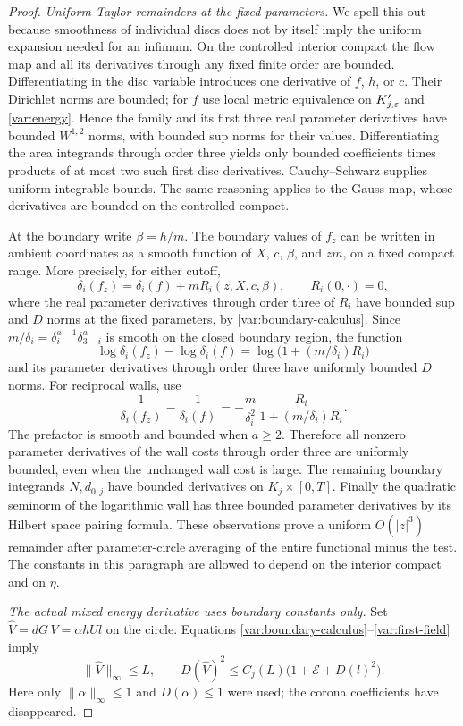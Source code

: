 \begin{proof}
\emph{Uniform Taylor remainders at the fixed parameters.}
We spell this out because smoothness of individual discs does not by
itself imply the uniform expansion needed for an infimum.
On the controlled interior compact the flow map and all its derivatives
through any fixed finite order are bounded.  Differentiating in the
disc variable introduces one derivative of $f$, $h$, or $c$.
Their Dirichlet norms are bounded; for $f$ use local metric equivalence
on $K_{j,\varepsilon}'$ and \eqref{var:energy}.  Hence the family and its first
three real parameter derivatives have bounded $W^{1,2}$ norms, with
bounded sup norms for their values.  Differentiating the area integrands
through order three yields only bounded coefficients times products of
at most two such first disc derivatives.  Cauchy--Schwarz supplies
uniform integrable bounds.  The same reasoning applies to the Gauss
map, whose derivatives are bounded on the controlled compact.

At the boundary write $\beta=h/m$.  The boundary values of $f_z$ can
be written in ambient coordinates as a smooth function of $X$, $c$,
$\beta$, and $z m$, on a fixed compact range.  More precisely, for
either cutoff,
\[
 \delta_i(f_z)=\delta_i(f)+m R_i(z,X,c,\beta),\qquad R_i(0,\cdot)=0,
\]
where the real parameter derivatives through order three of $R_i$
have bounded sup and $D$ norms at the fixed parameters, by
\eqref{var:boundary-calculus}.  Since
$m/\delta_i=\delta_i^{a-1}\delta_{3-i}^{a}$ is smooth on the closed
boundary region, the function
\[
 \log\delta_i(f_z)-\log\delta_i(f)
 =\log\bigl(1+(m/\delta_i)R_i\bigr)
\]
and its parameter derivatives through order three have uniformly
bounded $D$ norms.  For reciprocal walls, use
\[
 \frac1{\delta_i(f_z)}-\frac1{\delta_i(f)}
 =-\frac{m}{\delta_i^2}\,
 \frac{R_i}{1+(m/\delta_i)R_i}.
\]
The prefactor is smooth and bounded when $a\ge2$.  Therefore all
nonzero parameter derivatives of the wall costs through order three
are uniformly bounded, even when the unchanged wall cost is large.
The remaining boundary integrands $N,d_{0,j}$ have bounded derivatives
on $K_j\times[0,T]$.  Finally the quadratic seminorm of the logarithmic
wall has three bounded parameter derivatives by its Hilbert space
pairing formula.  These observations prove a uniform $O(|z|^3)$
remainder after parameter-circle averaging of the entire functional
minus the test.  The constants in this paragraph are allowed to depend
on the interior compact and on $\eta$.

\emph{The actual mixed energy derivative uses boundary constants only.}
Set $\widehat V=dG\,V=\alpha hUl$ on the circle.  Equations
\eqref{var:boundary-calculus}--\eqref{var:first-field} imply
\begin{equation}
 \|\widehat V\|_\infty\le L,
 \qquad D(\widehat V)^2\le
 C_j(L)\bigl(1+\mathcal E+D(l)^2\bigr).
 \label{var:first-field-bound}
\end{equation}
Here only $\|\alpha\|_\infty\le1$ and $D(\alpha)\le1$ were used;
the corona coefficients have disappeared.


\end{proof}
